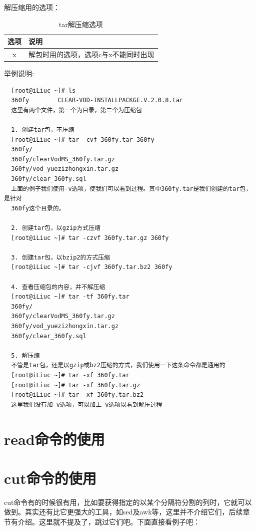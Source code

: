 解压缩用的选项：

\begin{table}[!h]
  \centering
    \begin{tabular}{cl}
      \toprule
      选项     & 说明 \\
      \midrule
      x        & 解包时用的选项，选项c与x不能同时出现 \\
      \bottomrule
    \end{tabular}
    \caption{tar解压缩选项}
    \label{tab:tarUncompressOpt}
\end{table}

举例说明:

\small{
\begin{verbatim}
  [root@iLiuc ~]# ls
  360fy        CLEAR-VOD-INSTALLPACKGE.V.2.0.8.tar
  这里有两个文件，第一个为目录，第二个为压缩包

  1. 创建tar包，不压缩
  [root@iLiuc ~]# tar -cvf 360fy.tar 360fy
  360fy/
  360fy/clearVodMS_360fy.tar.gz
  360fy/vod_yuezizhongxin.tar.gz
  360fy/clear_360fy.sql
  上面的例子我们使用-v选项，使我们可以看到过程。其中360fy.tar是我们创建的tar包，是针对
  360fy这个目录的。

  2. 创建tar包，以gzip方式压缩
  [root@iLiuc ~]# tar -czvf 360fy.tar.gz 360fy

  3. 创建tar包，以bzip2的方式压缩
  [root@iLiuc ~]# tar -cjvf 360fy.tar.bz2 360fy

  4. 查看压缩包的内容，并不解压缩
  [root@iLiuc ~]# tar -tf 360fy.tar
  360fy/
  360fy/clearVodMS_360fy.tar.gz
  360fy/vod_yuezizhongxin.tar.gz
  360fy/clear_360fy.sql

  5. 解压缩
  不管是tar包，还是以gzip或bz2压缩的方式，我们使用一下这条命令都是通用的
  [root@iLiuc ~]# tar -xf 360fy.tar
  [root@iLiuc ~]# tar -xf 360fy.tar.gz
  [root@iLiuc ~]# tar -xf 360fy.tar.bz2
  这里我们没有加-v选项，可以加上-v选项以看到解压过程
\end{verbatim}
}
\normalsize

\section{read命令的使用}
\label{sec:readCmd}

\section{cut命令的使用}
\label{sec:cutCmd}

cut命令有的时候很有用，比如要获得指定的以某个分隔符分割的列时，它就可以
做到。其实还有比它更强大的工具，如sed及awk等，这里并不介绍它们，后续章
节有介绍。这里就不提及了，跳过它们吧。下面直接看例子吧：

